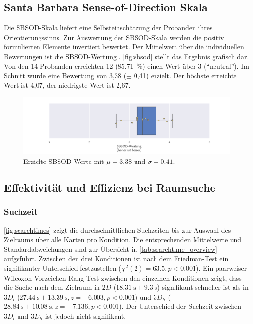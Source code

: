 \subsection{Santa Barbara Sense-of-Direction Skala}
Die SBSOD-Skala liefert eine Selbsteinschätzung der Probanden ihres Orientierungssinns.
Zur Auswertung der SBSOD-Skala werden die positiv formulierten Elemente invertiert bewertet.
Der Mittelwert über die individuellen Bewertungen ist die SBSOD-Wertung \parencite{Hegarty2002}.
\autoref{fig:sbsod} stellt das Ergebnis grafisch dar.
Von den 14 Probanden erreichten 12 (\SI{85,71}{\percent}) einen Wert über 3 (\enquote{neutral}).
Im Schnitt wurde eine Bewertung von 3,38 ($\pm$ 0,41) erzielt.
Der höchste erreichte Wert ist 4,07, der niedrigste Wert ist 2,67.
\begin{figure}[h!]
    \centering
    \includegraphics[trim={3cm, 0, 2.5cm, 0}, clip, width=0.9\linewidth]{figures/analysis/sbsod}
    \caption{Erzielte SBSOD-Werte mit $\mu = \num{3,38}$ und $\sigma = \num{0,41}$.}
    \label{fig:sbsod}
\end{figure}

\subsection{Effektivität und Effizienz bei Raumsuche}
\subsubsection*{Suchzeit}
\label{ssec:searchtime}

\autoref{fig:searchtimes} zeigt die durchschnittlichen Suchzeiten bis zur Auswahl des Zielraums über alle Karten pro Kondition.
Die entsprechenden Mittelwerte und Standardabweichungen sind zur Übersicht in \autoref{tab:searchtime_overview} aufgeführt.
Zwischen den drei Konditionen ist nach dem Friedman-Test ein signifikanter Unterschied festzustellen ($\chi^2(2) = \num{63.5}, p < 0.001$).
Ein paarweiser Wilcoxon-Vorzeichen-Rang-Test zwischen den einzelnen Konditionen zeigt, dass die Suche nach dem Zielraum in $2D$ ($\SI{18.31}{\second} \pm \SI{9.3}{\second}$) signifikant schneller ist als in $3D_l$ ($\SI{27.44}{\second} \pm \SI{13.39}{\second}, z=\num{-6.003}, p<\num{0.001}$) und $3D_h$ ($\SI{28.84}{\second} \pm \SI{10.08}{\second}, z=\num{-7.136}, p<0.001$).
Der Unterschied der Suchzeit zwischen $3D_l$ und $3D_h$ ist jedoch nicht signifikant.

